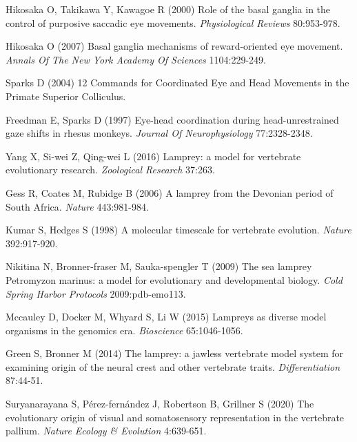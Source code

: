 \documentclass{ar-1col}
\begin{document}
{\begin{thebibliography}{00}
Hikosaka O, Takikawa Y, Kawagoe R (2000) 
Role of the basal ganglia in the control of purposive saccadic eye movements.
\textit{ Physiological Reviews} 80:953-978.

Hikosaka O (2007) 
Basal ganglia mechanisms of reward-oriented eye movement.
\textit{ Annals Of The New York Academy Of Sciences} 1104:229-249.

Sparks D (2004) 
12 Commands for Coordinated Eye and Head Movements in the Primate Superior Colliculus.
\textit{}

Freedman E, Sparks D (1997) 
Eye-head coordination during head-unrestrained gaze shifts in rhesus monkeys.
\textit{ Journal Of Neurophysiology} 77:2328-2348.

Yang X, Si-wei Z, Qing-wei L (2016) 
Lamprey: a model for vertebrate evolutionary research.
\textit{ Zoological Research} 37:263.

Gess R, Coates M, Rubidge B (2006) 
A lamprey from the Devonian period of South Africa.
\textit{ Nature} 443:981-984.

Kumar S, Hedges S (1998) 
A molecular timescale for vertebrate evolution.
\textit{ Nature} 392:917-920.

Nikitina N, Bronner-fraser M, Sauka-spengler T (2009) 
The sea lamprey Petromyzon marinus: a model for evolutionary and developmental biology.
\textit{ Cold Spring Harbor Protocols} 2009:pdb-emo113.

Mccauley D, Docker M, Whyard S, Li W (2015) 
Lampreys as diverse model organisms in the genomics era.
\textit{ Bioscience} 65:1046-1056.

Green S, Bronner M (2014) 
The lamprey: a jawless vertebrate model system for examining origin of the neural crest and other vertebrate traits.
\textit{ Differentiation} 87:44-51.

Suryanarayana S, P{\'e}rez-fern{\'a}ndez J, Robertson B, Grillner S (2020) 
The evolutionary origin of visual and somatosensory representation in the vertebrate pallium.
\textit{ Nature Ecology \& Evolution} 4:639-651.


\end{thebibliography}}
\end{document}
